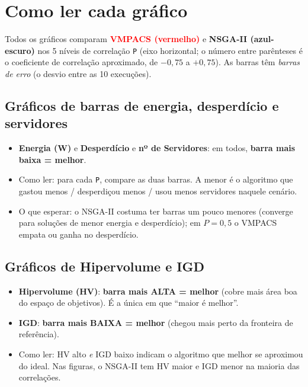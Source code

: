 \documentclass[11pt]{article}
\begin{document}
\section{Como ler cada gráfico}
Todos os gráficos comparam \textcolor{red}{\textbf{VMPACS (vermelho)}} e
\textbf{NSGA-II (azul-escuro)} nos 5 níveis de correlação \texttt{P} (eixo
horizontal; o número entre parênteses é o coeficiente de correlação aproximado,
de $-0{,}75$ a $+0{,}75$). As barras têm \emph{barras de erro} (o desvio entre as
10 execuções).

\subsection{Gráficos de barras de energia, desperdício e servidores}
\begin{itemize}[leftmargin=1.4em,itemsep=2pt]
  \item \textbf{Energia (W)} e \textbf{Desperdício} e \textbf{nº de Servidores}:
  em todos, \textbf{barra mais baixa = melhor}.
  \item Como ler: para cada \texttt{P}, compare as duas barras. A menor é o
  algoritmo que gastou menos / desperdiçou menos / usou menos servidores naquele
  cenário.
  \item O que esperar: o NSGA-II costuma ter barras um pouco menores (converge
  para soluções de menor energia e desperdício); em $P=0{,}5$ o VMPACS empata ou
  ganha no desperdício.
\end{itemize}

\subsection{Gráficos de Hipervolume e IGD}
\begin{itemize}[leftmargin=1.4em,itemsep=2pt]
  \item \textbf{Hipervolume (HV)}: \textbf{barra mais ALTA = melhor} (cobre mais
  área boa do espaço de objetivos). É a única em que ``maior é melhor''.
  \item \textbf{IGD}: \textbf{barra mais BAIXA = melhor} (chegou mais perto da
  fronteira de referência).
  \item Como ler: HV alto \emph{e} IGD baixo indicam o algoritmo que melhor se
  aproximou do ideal. Nas figuras, o NSGA-II tem HV maior e IGD menor na maioria
  das correlações.
\end{itemize}
\end{document}
